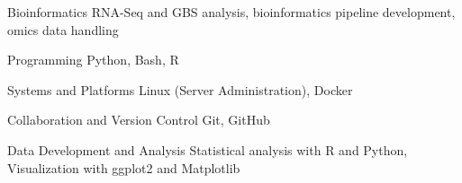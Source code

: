 


\begin{cvskills}

    
    \cvskill
    {Bioinformatics} %
    {RNA-Seq and GBS analysis, bioinformatics pipeline development, omics data handling} %
    
    
    \cvskill
    {Programming} %
    {Python, Bash, R} %
    
    
    \cvskill
    {Systems and Platforms} %
    {Linux (Server Administration), Docker} %
    
    
    \cvskill
    {Collaboration and Version Control} %
    {Git, GitHub} %
    
    
    \cvskill
    {Data Development and Analysis} %
    {Statistical analysis with R and Python, Visualization with ggplot2 and Matplotlib} %
    
\end{cvskills}
